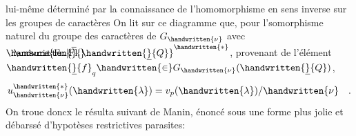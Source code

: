 lui-même déterminé par la connaissance de l'homomorphisme en sens inverse sur les groupes de caractères
On lit sur ce diagramme que, pour l'somorphisme naturel du groupe des caractères de $G_{\handwritten{\nu}}$ avec $\rlap{$\phantom{Q}\unsure{\mathrm{Fr.}|\mathrm{Fl.}}$}\handwritten{\overline}{\handwritten{\underline}{Q}}^{\handwritten{*}}$, provenant de l'élément $\handwritten{\underline}{f}_q\handwritten{\in}G_{\handwritten{\nu}}(\handwritten{\underline}{Q})$,  
\[
u_{\handwritten{\nu}}^{\handwritten{*}}(\handwritten{\lambda})=v_p(\handwritten{\lambda})/\handwritten{\nu}\quad .
\]
On troue doncx le résulta suivant de Manin, énoncé sous une forme plus jolie et débarssé d'hypotèses restrictives parasites:

